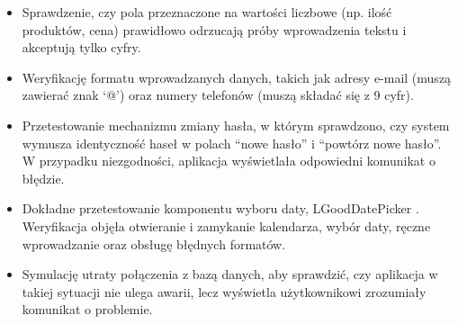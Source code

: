 \begin{itemize}
    \item Sprawdzenie, czy pola przeznaczone na wartości liczbowe (np. ilość produktów, cena) prawidłowo odrzucają próby wprowadzenia tekstu i akceptują tylko cyfry.
    \item Weryfikację formatu wprowadzanych danych, takich jak adresy e-mail (muszą zawierać znak ‘@’) oraz numery telefonów (muszą składać się z 9 cyfr).
    \item Przetestowanie mechanizmu zmiany hasła, w którym sprawdzono, czy system wymusza identyczność haseł w polach ``nowe hasło'' i ``powtórz nowe hasło''. W przypadku niezgodności, aplikacja wyświetlała odpowiedni komunikat o błędzie.
    \item Dokładne przetestowanie komponentu wyboru daty, LGoodDatePicker \cite{LGoodDatePicker}. Weryfikacja objęła otwieranie i zamykanie kalendarza, wybór daty, ręczne wprowadzanie oraz obsługę błędnych formatów.
    \item Symulację utraty połączenia z bazą danych, aby sprawdzić, czy aplikacja w takiej sytuacji nie ulega awarii, lecz wyświetla użytkownikowi zrozumiały komunikat o problemie.
\end{itemize}